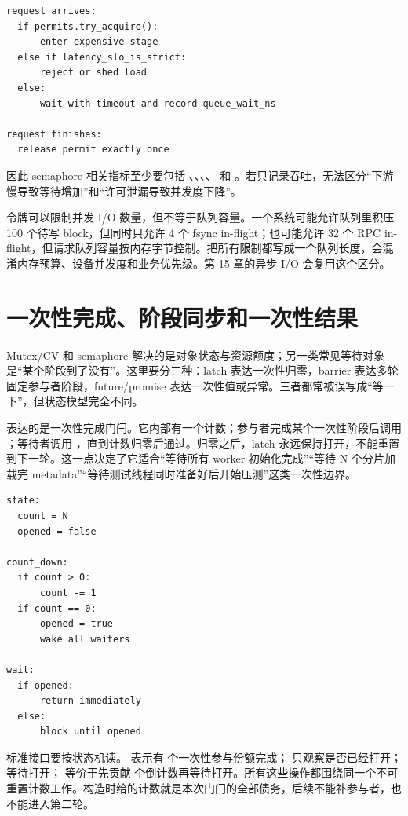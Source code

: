 \begin{lstlisting}[numbers=none,caption={用 semaphore 表达 in-flight 预算}]
request arrives:
  if permits.try_acquire():
      enter expensive stage
  else if latency_slo_is_strict:
      reject or shed load
  else:
      wait with timeout and record queue_wait_ns

request finishes:
  release permit exactly once
\end{lstlisting}

因此 semaphore 相关指标至少要包括 、、、、 和 。若只记录吞吐，无法区分“下游慢导致等待增加”和“许可泄漏导致并发度下降”。

令牌可以限制并发 I/O 数量，但不等于队列容量。一个系统可能允许队列里积压 100 个待写 block，但同时只允许 4 个 fsync in-flight；也可能允许 32 个 RPC in-flight，但请求队列容量按内存字节控制。把所有限制都写成一个队列长度，会混淆内存预算、设备并发度和业务优先级。第 15 章的异步 I/O 会复用这个区分。

\section{一次性完成、阶段同步和一次性结果}

Mutex/CV 和 semaphore 解决的是对象状态与资源额度；另一类常见等待对象是“某个阶段到了没有”。这里要分三种：latch 表达一次性归零，barrier 表达多轮固定参与者阶段，future/promise 表达一次性值或异常。三者都常被误写成“等一下”，但状态模型完全不同。

 表达的是一次性完成门闩。它内部有一个计数；参与者完成某个一次性阶段后调用 ；等待者调用 ，直到计数归零后通过。归零之后，latch 永远保持打开，不能重置到下一轮。这一点决定了它适合“等待所有 worker 初始化完成”“等待 N 个分片加载完 metadata”“等待测试线程同时准备好后开始压测”这类一次性边界。

\begin{lstlisting}[numbers=none,caption={latch 的状态机}]
state:
  count = N
  opened = false

count_down:
  if count > 0:
      count -= 1
  if count == 0:
      opened = true
      wake all waiters

wait:
  if opened:
      return immediately
  else:
      block until opened
\end{lstlisting}

标准接口要按状态机读。 表示有  个一次性参与份额完成； 只观察是否已经打开； 等待打开； 等价于先贡献  个倒计数再等待打开。所有这些操作都围绕同一个不可重置计数工作。构造时给的计数就是本次门闩的全部债务，后续不能补参与者，也不能进入第二轮。

